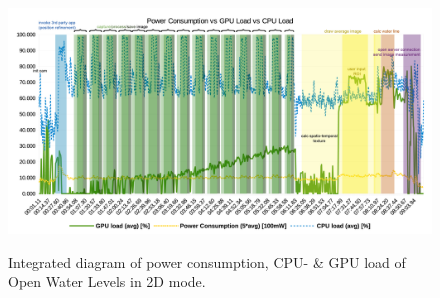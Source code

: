 \documentclass[review]{elsarticle}
\begin{document}
\begin{figure}[htbp!]
\begin{center}
	 	{\includegraphics[keepaspectratio, width=0.95\columnwidth]{graphics/OWL_Nexus5/Power_GPU_CPU_run2}}
	\caption{Integrated diagram of power consumption, CPU- \& GPU load of Open Water Levels in 2D mode.}
\end{center}
\label{fig:power:Power_CPU_GPU_OWL:2D}
\end{figure}
\end{document}
